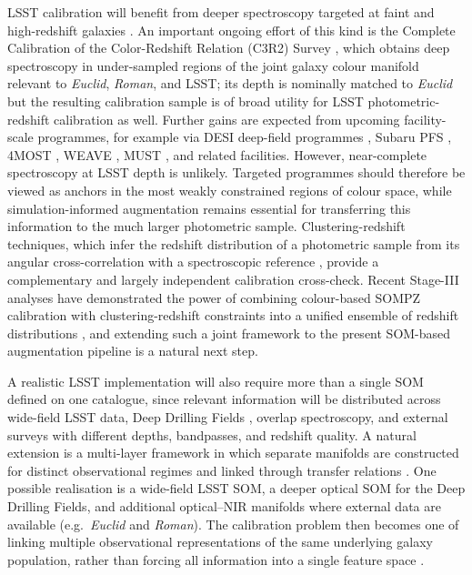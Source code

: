 LSST calibration will benefit from deeper spectroscopy targeted at faint and high-redshift galaxies \citep{2014arXiv1410.4506S, 2014arXiv1410.4498A, 2015APh....63...81N}. An important ongoing effort of this kind is the Complete Calibration of the Color-Redshift Relation (C3R2) Survey \citep{2017ApJ...841..111M, 2019ApJ...877...81M, 2020A&A...642A.192E}, which obtains deep spectroscopy in under-sampled regions of the joint galaxy colour manifold relevant to \textit{Euclid}, \textit{Roman}, and LSST; its depth is nominally matched to \textit{Euclid} but the resulting calibration sample is of broad utility for LSST photometric-redshift calibration as well. Further gains are expected from upcoming facility-scale programmes, for example via DESI \citep{2022AJ....164..207D} deep-field programmes \citep{2025arXiv251215964B, 2026AJ....171...71R}, Subaru PFS \citep{2014PASJ...66R...1T}, 4MOST \citep{2016SPIE.9910E..1NW}, WEAVE \citep{2024MNRAS.530.2688J}, MUST \citep{2024arXiv241107970Z}, and related facilities. However, near-complete spectroscopy at LSST depth is unlikely. Targeted programmes should therefore be viewed as anchors in the most weakly constrained regions of colour space, while simulation-informed augmentation remains essential for transferring this information to the much larger photometric sample. Clustering-redshift techniques, which infer the redshift distribution of a photometric sample from its angular cross-correlation with a spectroscopic reference \citep{2008ApJ...684...88N, 2020A&A...642A.200V, 2022MNRAS.510.1223G, 2023MNRAS.524.5109R}, provide a complementary and largely independent calibration cross-check. Recent Stage-III analyses have demonstrated the power of combining colour-based SOMPZ calibration with clustering-redshift constraints into a unified ensemble of redshift distributions \citep{2024MNRAS.527.2010G, 2025arXiv251023566Y, 2025arXiv250319440W}, and extending such a joint framework to the present SOM-based augmentation pipeline is a natural next step.

A realistic LSST implementation will also require more than a single SOM defined on one catalogue, since relevant information will be distributed across wide-field LSST data, Deep Drilling Fields \citep{2024ApJS..275...21G}, overlap spectroscopy, and external surveys with different depths, bandpasses, and redshift quality. A natural extension is a multi-layer framework in which separate manifolds are constructed for distinct observational regimes and linked through transfer relations \citep{2019MNRAS.489..820B}. One possible realisation is a wide-field LSST SOM, a deeper optical SOM for the Deep Drilling Fields, and additional optical--NIR manifolds where external data are available (e.g.\ \textit{Euclid} and \textit{Roman}). The calibration problem then becomes one of linking multiple observational representations of the same underlying galaxy population, rather than forcing all information into a single feature space \citep{2022ApJS..258...15E}.

